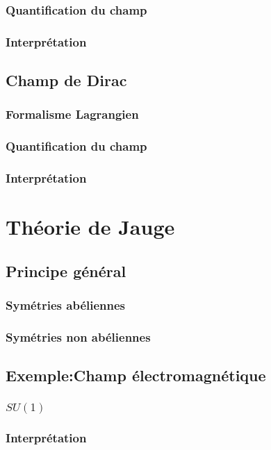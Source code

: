 \documentclass{article}
\begin{document}
			\subsubsection{Quantification du champ}
			\subsubsection{Interprétation}
		\subsection{Champ de Dirac}
			\subsubsection{Formalisme Lagrangien}
			\subsubsection{Quantification du champ}
			\subsubsection{Interprétation}
		
	\section{Théorie de Jauge}
		\subsection{Principe général}
			\subsubsection{Symétries abéliennes}
			\subsubsection{Symétries non abéliennes}
		\subsection{Exemple:Champ électromagnétique}
			\subsubsection{$SU(1)$}
			\subsubsection{Interprétation}
\end{document}
